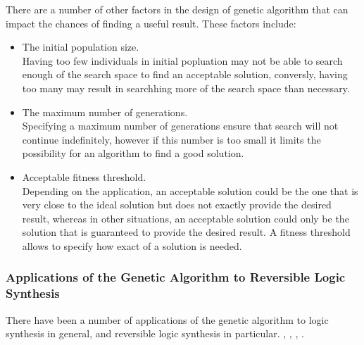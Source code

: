 There are a number of other factors in the design of genetic algorithm that can impact the chances of finding a useful result. 
These factors include:
\begin{itemize}
 \item The initial population size.
\\ Having too few individuals in initial popluation may not be able to search enough of the search space to 
find an acceptable solution, conversly, having too many may result in searchhing more of the search space than necessary.
 \item The maximum number of generations.
\\ Specifying a maximum number of generations ensure that search will not continue indefinitely, however if this number is too 
small it limits the possibility for an algorithm to find a good solution.
 \item Acceptable fitness threshold.
\\Depending on the application, an acceptable solution could be the one that is very close to the ideal solution but does not exactly provide the
desired result, whereas in other situations, an acceptable solution could only be the solution that is guaranteed to provide the desired result. 
A fitness threshold allows to specify how exact of a solution is needed.  
\end{itemize}
 

\subsubsection{Applications of the Genetic Algorithm to Reversible Logic Synthesis}

There have been a number of applications of the genetic algorithm to logic synthesis in general, and reversible logic synthesis in 
particular. \cite{Lukac2003}, \cite{Lukac2008}, \cite{Khan2004}, \cite{Aguirre2003}.
